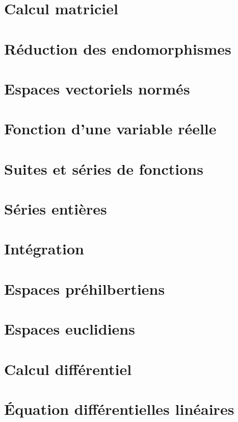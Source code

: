 \documentclass[12pt]{article}
\theoremstyle{remark}
\theoremstyle{remark}
\begin{document}
\cleardoublepage
\section{Calcul matriciel}
\cleardoublepage
\section{Réduction des endomorphismes}
\cleardoublepage
\section{Espaces vectoriels normés}
\cleardoublepage
\section{Fonction d'une variable réelle}
\cleardoublepage
\section{Suites et séries de fonctions}
\cleardoublepage
\section{Séries entières}
\cleardoublepage
\section{Intégration}
\cleardoublepage
\section{Espaces préhilbertiens}
\cleardoublepage
\section{Espaces euclidiens}
\cleardoublepage
\section{Calcul différentiel}
\cleardoublepage
\section{\'Equation différentielles linéaires}
\end{document}
